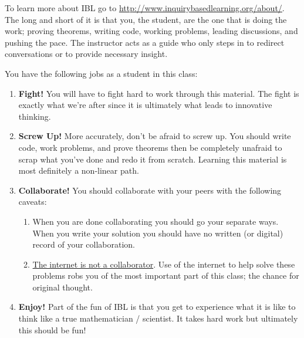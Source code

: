 To learn more about IBL go to
\href{http://www.inquirybasedlearning.org/about/}{http://www.inquirybasedlearning.org/about/}.
The long and short of it is that you, the student, are the one that is doing the
work; proving theorems, writing code, working problems, leading discussions, and pushing
the pace. The instructor acts as a guide who only steps in to redirect conversations or to
provide necessary insight. 

You have the following jobs as a student in this class:
\begin{enumerate}
    \item {\bf Fight!}  You will have to fight hard to work through this material.  The fight is
        exactly what we're after since it is ultimately what leads to innovative thinking.
    \item {\bf Screw Up!}  More accurately, don't be afraid to screw up.  You should write code,
    work problems, and prove theorems then be completely unafraid to scrap what you've
    done and redo it from scratch.  Learning this material is most definitely a non-linear
    path.
\item {\bf Collaborate!}  You should collaborate with your peers with the following caveats:
    \begin{enumerate}
        \item When you are done collaborating you should go your separate ways.  When you
            write your solution you should have no written (or digital) record of your
            collaboration.  
        \item \underline{The internet is not a collaborator}.  Use of the internet to help
            solve these problems robs you of the most important part of this class; the
            chance for original thought.
    \end{enumerate}
\item {\bf Enjoy!}  Part of the fun of IBL is that you get to experience what it is like to
        think like a true mathematician / scientist.  It takes hard work but ultimately
        this should be fun!
\end{enumerate}

